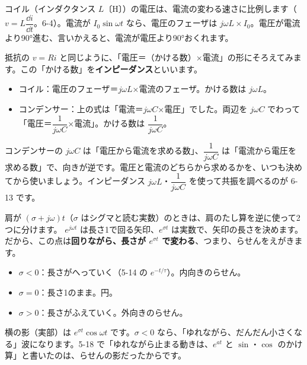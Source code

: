 コイル（インダクタンス $L$〔H〕）の電圧は、電流の変わる速さに比例します（$v=L\dfrac{\dd i}{\dd t}$。6-4）。電流が $I_0\sin\omega t$ なら、電圧のフェーザは $j\omega L\times I_0$。電圧が電流より90°進む、言いかえると、電流が電圧より90°おくれます。\par
抵抗の $v=Ri$ と同じように、「電圧＝（かける数）×電流」の形にそろえてみます。この「かける数」を\textbf{インピーダンス}といいます。
\begin{itemize}[leftmargin=1.2\zw, itemsep=2pt, topsep=2pt, label={\color{\bkTT}●}]
\item コイル：電圧のフェーザ＝$j\omega L$×電流のフェーザ。かける数は $j\omega L$。
\item コンデンサー：上の式は「電流＝$j\omega C$×電圧」でした。両辺を $j\omega C$ でわって「電圧＝$\dfrac{1}{j\omega C}$×電流」。かける数は $\dfrac{1}{j\omega C}$。
\end{itemize}
コンデンサーの $j\omega C$ は「電圧から電流を求める数」、$\dfrac{1}{j\omega C}$ は「電流から電圧を求める数」で、向きが逆です。電圧と電流のどちらから求めるかを、いつも決めてから使いましょう。インピーダンス $j\omega L$・$\dfrac{1}{j\omega C}$ を使って共振を調べるのが 6-13 です。


\label{bk:6-10:rasen}肩が $(\sigma+j\omega)t$（$\sigma$ はシグマと読む実数）のときは、肩のたし算を逆に使って2つに分けます。
$e^{j\omega t}$ は長さ1で回る矢印、$e^{\sigma t}$ は実数で、矢印の長さを決めます。だから、この点は\textbf{回りながら、長さが $e^{\sigma t}$ で変わる}、つまり、らせんをえがきます。
\begin{itemize}[leftmargin=1.2\zw, itemsep=2pt, topsep=2pt, label={\color{\bkTT}●}]
\item $\sigma<0$：長さがへっていく（5-14 の $e^{-t/\tau}$）。内向きのらせん。
\item $\sigma=0$：長さ1のまま。円。
\item $\sigma>0$：長さがふえていく。外向きのらせん。
\end{itemize}
横の影（実部）は $e^{\sigma t}\cos\omega t$ です。$\sigma<0$ なら、「ゆれながら、だんだん小さくなる」波になります。5-18 で「ゆれながら止まる動きは、$e^{at}$ と $\sin$・$\cos$ のかけ算」と書いたのは、らせんの影だったからです。

